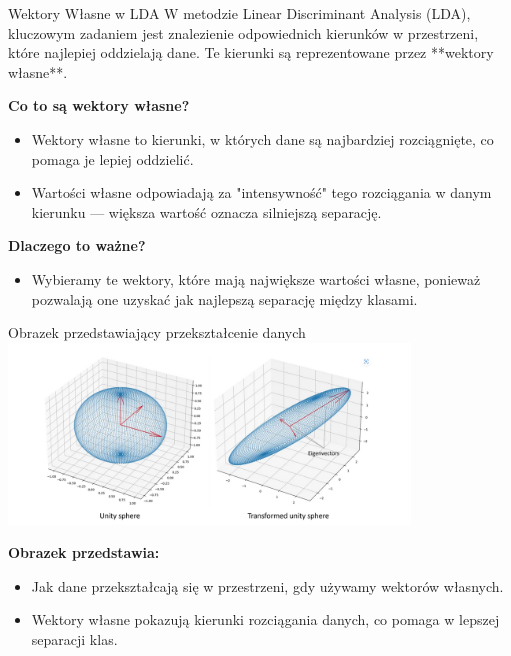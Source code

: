 \documentclass{beamer}
\begin{document}
\begin{frame}{Wektory Własne w LDA}
    W metodzie Linear Discriminant Analysis (LDA), kluczowym zadaniem jest znalezienie odpowiednich kierunków w przestrzeni, które najlepiej oddzielają dane.
    Te kierunki są reprezentowane przez **wektory własne**.

    \bigskip
    \textbf{Co to są wektory własne?}  
    \begin{itemize}
        \item Wektory własne to kierunki, w których dane są najbardziej rozciągnięte, co pomaga je lepiej oddzielić.
        \item Wartości własne odpowiadają za "intensywność" tego rozciągania w danym kierunku — większa wartość oznacza silniejszą separację.
    \end{itemize}

    \bigskip
    \textbf{Dlaczego to ważne?}  
    \begin{itemize}
        \item Wybieramy te wektory, które mają największe wartości własne, ponieważ pozwalają one uzyskać jak najlepszą separację między klasami.
    \end{itemize}
\end{frame}


\begin{frame}{Obrazek przedstawiający przekształcenie danych}
    \includegraphics[width=0.8\textwidth]{unity_transf_unity.png}
    
    \bigskip
    \textbf{Obrazek przedstawia:}
    \begin{itemize}
        \item Jak dane przekształcają się w przestrzeni, gdy używamy wektorów własnych.
        \item Wektory własne pokazują kierunki rozciągania danych, co pomaga w lepszej separacji klas.
    \end{itemize}
\end{frame}
\end{document}
